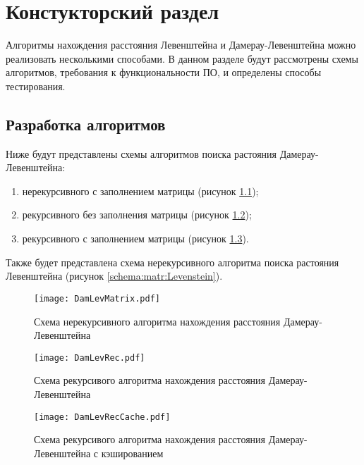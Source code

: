 \chapter{ Констукторский раздел}
\label{cha:design}
    Алгоритмы нахождения расстояния Левенштейна и Дамерау-Левенштейна можно реализовать несколькими способами. В данном разделе будут рассмотрены схемы алгоритмов, требования к функциональности ПО,
    и определены способы тестирования.
    
    \section{Разработка алгоритмов}
        Ниже будут представлены схемы алгоритмов поиска растояния Дамерау-Левенштейна: \begin{enumerate}
            \item нерекурсивного с заполнением матрицы (рисунок \ref{schema:matr:DamLevenstein});
            \item рекурсивного без заполнения матрицы (рисунок \ref{schema:rec:DamLevenstein});
            \item рекурсивного с заполнением матрицы (рисунок \ref{schema:rec-matr:DamLevenstein}).
        \end{enumerate}

        Также будет представлена схема нерекурсивного алгоритма поиска растояния Левенштейна (рисунок \ref{schema:matr:Levenstein}). 
       
       	    \begin{figure}[h!]
       		\centering
       		\texttt{[image: DamLevMatrix.pdf]}
       		\caption{Схема нерекурсивного алгоритма нахождения расстояния Дамерау-Левенштейна}
       		\label{schema:matr:DamLevenstein}
       	\end{figure}\clearpage
       	
       	\begin{figure}[h!]
       		\centering
		\texttt{[image: DamLevRec.pdf]}
       		\caption{Схема рекурсивого алгоритма нахождения расстояния Дамерау-Левенштейна}
       		\label{schema:rec:DamLevenstein} 
       	\end{figure}\clearpage
       	
       	\begin{figure}[h!]
       		\centering
		\texttt{[image: DamLevRecCache.pdf]}
       		\caption{Схема рекурсивого алгоритма нахождения расстояния Дамерау-Левенштейна с кэшированием}
       		\label{schema:rec-matr:DamLevenstein}
       	\end{figure}\clearpage
       	
